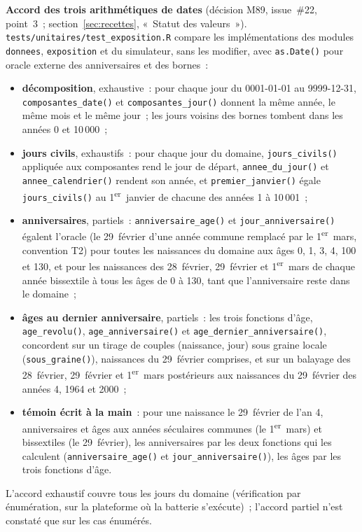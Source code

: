\documentclass[a4paper,11pt]{article}
\newcommand{\code}[1]{\texttt{\small #1}}
\begin{document}
\medskip
\textbf{Accord des trois arithmétiques de dates} (décision M89, issue~\#22,
point~3~; section~\ref{sec:recettes}, «~Statut des valeurs~»).
\code{tests/unitaires/test\_exposition.R} compare les implémentations des
modules \code{donnees}, \code{exposition} et du simulateur, sans les
modifier, avec \code{as.Date()} pour oracle externe des anniversaires et
des bornes~:
\begin{itemize}[leftmargin=*, itemsep=2pt]
  \item \textbf{décomposition}, exhaustive~: pour chaque jour du
    0001-01-01 au 9999-12-31, \code{composantes\_date()} et
    \code{composantes\_jour()} donnent la même année, le même mois et le
    même jour~; les jours voisins des bornes tombent dans les années 0
    et 10\,000~;
  \item \textbf{jours civils}, exhaustifs~: pour chaque jour du domaine,
    \code{jours\_civils()} appliquée aux composantes rend le jour de départ,
    \code{annee\_du\_jour()} et \code{annee\_calendrier()} rendent son année,
    et \code{premier\_janvier()} égale \code{jours\_civils()} au
    1\textsuperscript{er}~janvier de chacune des années 1 à 10\,001~;
  \item \textbf{anniversaires}, partiels~: \code{anniversaire\_age()} et
    \code{jour\_anniversaire()} égalent l'oracle (le 29~février d'une année
    commune remplacé par le 1\textsuperscript{er}~mars, convention T2) pour
    toutes les naissances du domaine aux âges 0, 1, 3, 4, 100 et 130, et
    pour les naissances des 28~février, 29~février et
    1\textsuperscript{er}~mars de chaque année bissextile à tous les âges
    de 0 à 130, tant que l'anniversaire reste dans le domaine~;
  \item \sloppy \textbf{âges au dernier anniversaire}, partiels~: les
    trois fonctions d'âge, \code{age\_revolu()}, \code{age\_anniversaire()}
    et \code{age\_dernier\_anniversaire()}, concordent sur un tirage de couples
    (naissance, jour) sous graine locale (\code{sous\_graine()}), naissances
    du 29~février comprises, et sur un balayage des 28~février,
    29~février et 1\textsuperscript{er}~mars postérieurs aux naissances du
    29~février des années 4, 1964 et 2000~;
  \item \textbf{témoin écrit à la main}~: pour une naissance le
    29~février de l'an 4, anniversaires et âges aux années séculaires
    communes (le 1\textsuperscript{er}~mars) et bissextiles (le
    29~février), les anniversaires par les deux fonctions qui les
    calculent (\code{anniversaire\_age()} et \code{jour\_anniversaire()}),
    les âges par les trois fonctions d'âge.
\end{itemize}
L'accord exhaustif couvre tous les jours du domaine (vérification par
énumération, sur la plateforme où la batterie s'exécute)~; l'accord partiel
n'est constaté que sur les cas énumérés.
\end{document}
